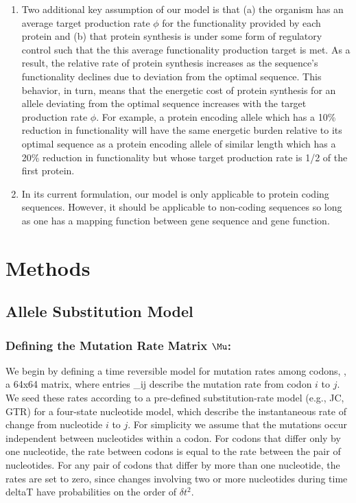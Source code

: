 \documentclass{article}
\begin{document}
\begin{enumerate}
\item Two additional key assumption of our model is that (a) the organism has an average target production rate $\phi$ for the functionality provided by each protein and (b) that protein synthesis is under some form of  regulatory control such that the this average functionality production target is met.
As a result, the relative rate of protein synthesis increases as the sequence's functionality declines due to deviation from the optimal sequence.
This behavior, in turn, means that the energetic cost of protein synthesis for an allele deviating from the optimal sequence increases with the target production rate $\phi$.
For example, a protein encoding allele which has a 10\% reduction in functionality will have the same energetic burden relative to its optimal sequence as a protein encoding allele of similar length which has a 20\% reduction in functionality but whose target production rate is 1/2 of the first protein.
\item In its current formulation, our model is only applicable to protein coding sequences.
However, it should be applicable to non-coding sequences so long as one has a mapping function between gene sequence and gene function.
\end{enumerate}




\section*{Methods}
\subsection*{Allele Substitution Model}
\subsubsection*{Defining the Mutation Rate Matrix $\Mu$: }
We begin by defining a time reversible model for mutation rates among codons, \Mu, a 64x64 matrix, where entries \mu_ij describe the mutation rate from codon $i$ to $j$.
We seed these rates according to a pre-defined substitution-rate model (e.g., JC, GTR) for a four-state nucleotide model, which describe the instantaneous rate of change from nucleotide $i$ to $j$.
For simplicity we assume that the mutations occur independent between nucleotides within a codon. 
For codons that differ only by one nucleotide, the rate between codons is equal to the rate between the pair of nucleotides.
For any pair of codons that differ by more than one nucleotide, the rates are set to zero, since changes involving two or more nucleotides during time deltaT have probabilities on the order of $\delta t^2$. 
\end{document}
